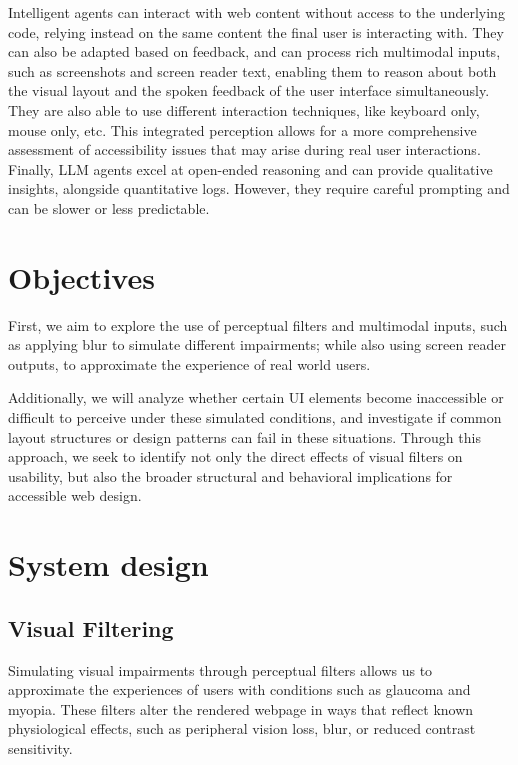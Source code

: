 Intelligent agents can interact with web content without access to the underlying code, relying instead on the same content the final user is interacting with\cite{lanham2025ai, wang2024survey, lu2025uxagent}. They can also be adapted based on feedback, and can process rich multimodal inputs, such as screenshots and screen reader text, enabling them to reason about both the visual layout and the spoken feedback of the user interface simultaneously. They are also able to use different interaction techniques, like keyboard only, mouse only, etc. This integrated perception allows for a more comprehensive assessment of accessibility issues that may arise during real user interactions. Finally, LLM agents excel at open-ended reasoning and can provide qualitative insights, alongside quantitative logs. However, they require careful prompting and can be slower or less predictable.


\section{Objectives}

First, we aim to explore the use of perceptual filters and multimodal inputs, such as applying blur to simulate different impairments; while also using screen reader outputs, to approximate the experience of real world users. 

Additionally, we will analyze whether certain UI elements become inaccessible or difficult to perceive under these simulated conditions, and investigate if common layout structures or design patterns can fail in these situations. Through this approach, we seek to identify not only the direct effects of visual filters on usability, but also the broader structural and behavioral implications for accessible web design.

\section{System design}
\subsection{Visual Filtering}

Simulating visual impairments through perceptual filters allows us to approximate the experiences of users with conditions such as glaucoma and myopia. These filters alter the rendered webpage in ways that reflect known physiological effects, such as peripheral vision loss, blur, or reduced contrast sensitivity.

